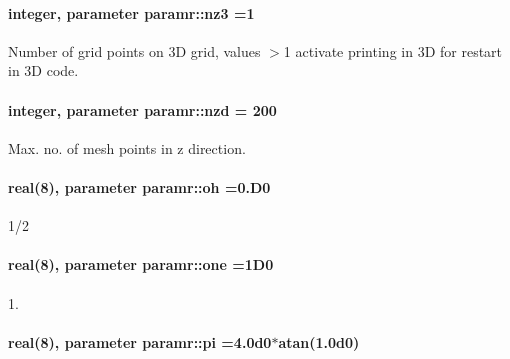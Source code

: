 \paragraph[{\texorpdfstring{nz3}{nz3}}]{\setlength{\rightskip}{0pt plus 5cm}integer, parameter paramr\+::nz3 =1}\hypertarget{namespaceparamr_a024bce0c675160a27120f8bc6effe098}{}\label{namespaceparamr_a024bce0c675160a27120f8bc6effe098}


Number of grid points on 3D grid, values $>$1 activate printing in 3D for restart in 3D code. 

\paragraph[{\texorpdfstring{nzd}{nzd}}]{\setlength{\rightskip}{0pt plus 5cm}integer, parameter paramr\+::nzd = 200}\hypertarget{namespaceparamr_aadc71badb7f729eaddb68ef0f99b135a}{}\label{namespaceparamr_aadc71badb7f729eaddb68ef0f99b135a}


Max. no. of mesh points in z direction. 

\paragraph[{\texorpdfstring{oh}{oh}}]{\setlength{\rightskip}{0pt plus 5cm}real(8), parameter paramr\+::oh =0.\+D0}\hypertarget{namespaceparamr_aac25693e19c755d7f856ed0784043f4e}{}\label{namespaceparamr_aac25693e19c755d7f856ed0784043f4e}


1/2 

\paragraph[{\texorpdfstring{one}{one}}]{\setlength{\rightskip}{0pt plus 5cm}real(8), parameter paramr\+::one =1\+D0}\hypertarget{namespaceparamr_a3038617abc42e475c822dcf484e2082e}{}\label{namespaceparamr_a3038617abc42e475c822dcf484e2082e}


1. 

\paragraph[{\texorpdfstring{pi}{pi}}]{\setlength{\rightskip}{0pt plus 5cm}real(8), parameter paramr\+::pi =4.\+0d0$\ast$atan(1.\+0d0)}\hypertarget{namespaceparamr_a7e2dc20cc92d78c7f3473ce67b11d0f0}{}\label{namespaceparamr_a7e2dc20cc92d78c7f3473ce67b11d0f0}


